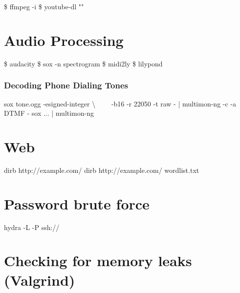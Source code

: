 \documentclass{refcard}
\begin{document}
\begin{ldesc}
	  \$ ffmpeg -i  
	 \$ youtube-dl ""
\end{ldesc}


\section{Audio Processing}

\begin{ldesc}
	   \$ audacity 
	\li[Spectrogram]                   \$ sox  -n spectrogram
	       \$ midi2ly 
	          \$ lilypond 
\end{ldesc}

\subsubsection{Decoding Phone Dialing Tones}

\begin{ldesc}
	   sox tone.ogg -esigned-integer \textbackslash \li
	                   ~~~~-b16 -r 22050 -t raw - | \li
	                   multimon-ng -c -a DTMF -
	 sox ... | multimon-ng
\end{ldesc}


\section{Web}

\begin{ldesc}
	       dirb http://example.com/
	 dirb http://example.com/ wordlist.txt
\end{ldesc}


\section{Password brute force}

\begin{ldesc}
	 hydra -L  -P  ssh://
\end{ldesc}


\section{Checking for memory leaks (Valgrind)}
\end{document}

